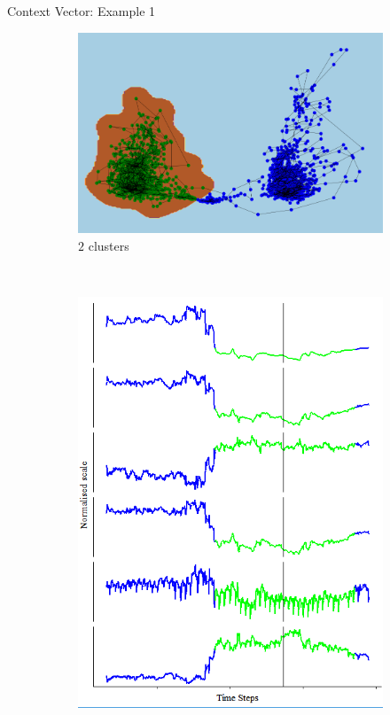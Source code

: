 \documentclass{beamer}
\begin{document}
\begin{frame}[shrink]{Context Vector: Example 1}
\begin{figure}[H]
	\centering
	\begin{subfigure}[b]{0.5\textwidth}
		\includegraphics[width=\textwidth]{pca_cluster_2.png}
		\caption{\(2\) clusters}
		\label{fig:pca_cluster_2}
	\end{subfigure}
	~
	\begin{subfigure}[b]{0.25\textwidth}
		\includegraphics[width=\textwidth]{context_timeline_2.png}
		\label{fig:context_timeline_2}
	\end{subfigure}
	

\end{figure}
\end{frame}
\end{document}
